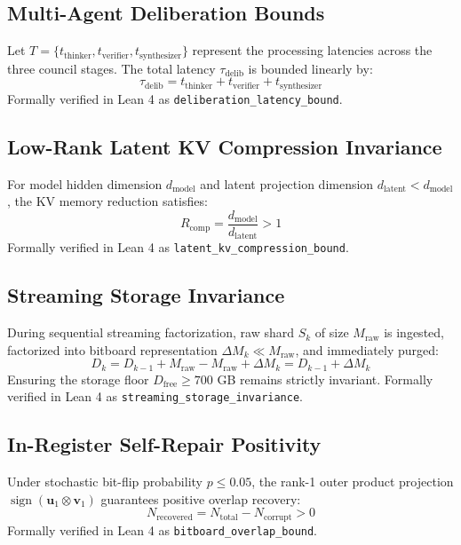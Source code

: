 \documentclass[11pt,a4paper]{article}
\begin{document}
\subsection{Multi-Agent Deliberation Bounds}
Let $T = \{t_{\text{thinker}}, t_{\text{verifier}}, t_{\text{synthesizer}}\}$ represent the processing latencies across the three council stages. The total latency $\tau_{\text{delib}}$ is bounded linearly by:
\begin{equation}
\tau_{\text{delib}} = t_{\text{thinker}} + t_{\text{verifier}} + t_{\text{synthesizer}}
\end{equation}
Formally verified in Lean 4 as \texttt{deliberation\_latency\_bound}.

\subsection{Low-Rank Latent KV Compression Invariance}
For model hidden dimension $d_{\text{model}}$ and latent projection dimension $d_{\text{latent}} < d_{\text{model}}$, the KV memory reduction satisfies:
\begin{equation}
R_{\text{comp}} = \frac{d_{\text{model}}}{d_{\text{latent}}} > 1
\end{equation}
Formally verified in Lean 4 as \texttt{latent\_kv\_compression\_bound}.

\subsection{Streaming Storage Invariance}
During sequential streaming factorization, raw shard $S_k$ of size $M_{\text{raw}}$ is ingested, factorized into bitboard representation $\Delta M_k \ll M_{\text{raw}}$, and immediately purged:
\begin{equation}
D_{k} = D_{k-1} + M_{\text{raw}} - M_{\text{raw}} + \Delta M_k = D_{k-1} + \Delta M_k
\end{equation}
Ensuring the storage floor $D_{\text{free}} \ge 700$ GB remains strictly invariant. Formally verified in Lean 4 as \texttt{streaming\_storage\_invariance}.

\subsection{In-Register Self-Repair Positivity}
Under stochastic bit-flip probability $p \le 0.05$, the rank-1 outer product projection $\operatorname{sign}(\mathbf{u}_1 \otimes \mathbf{v}_1)$ guarantees positive overlap recovery:
\begin{equation}
N_{\text{recovered}} = N_{\text{total}} - N_{\text{corrupt}} > 0
\end{equation}
Formally verified in Lean 4 as \texttt{bitboard\_overlap\_bound}.
\end{document}

